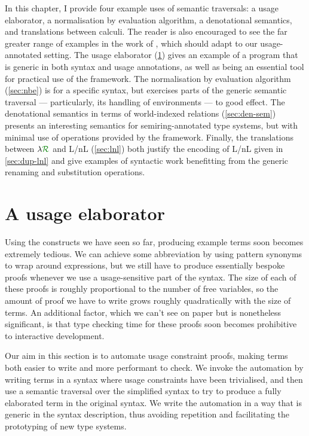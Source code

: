 In this chapter, I provide four example uses of semantic traversals:
a usage elaborator, a normalisation by evaluation algorithm, a denotational
semantics, and translations between calculi.
The reader is also encouraged to see the far greater range of examples in the
work of \citet{AACMM21}, which should adapt to our usage-annotated setting.
The usage elaborator (\cref{sec:usage-elaborator}) gives an example of a program
that is generic in both syntax and usage annotations, as well as being an
essential tool for practical use of the framework.
The normalisation by evaluation algorithm (\cref{sec:nbe}) is for a specific
syntax, but exercises parts of the generic semantic traversal --- particularly,
its handling of environments --- to good effect.
The denotational semantics in terms of world-indexed relations
(\cref{sec:den-sem}) presents an interesting semantics for semiring-annotated
type systems, but with minimal use of operations provided by the framework.
Finally, the translations between $\name$ and L/nL (\cref{sec:lnl}) both justify
the encoding of L/nL given in \cref{sec:dup-lnl} and give examples of syntactic
work benefitting from the generic renaming and substitution operations.


\section{A usage elaborator}\label{sec:usage-elaborator}

Using the constructs we have seen so far, producing example terms soon becomes
extremely tedious.
We can achieve some abbreviation by using pattern synonyms to wrap around
 expressions, but we still have to
produce essentially bespoke proofs whenever we use a usage-sensitive part of the
syntax.
The size of each of these proofs is roughly proportional to the number of free
variables, so the amount of proof we have to write grows roughly quadratically
with the size of terms.
An additional factor, which we can't see on paper but is nonetheless
significant, is that type checking time
for these proofs soon becomes prohibitive to interactive development.

Our aim in this section is to automate usage constraint proofs, making terms
both easier to write and more performant to check.
We invoke the automation by writing terms in a syntax where usage constraints
have been trivialised, and then use a semantic traversal over the simplified
syntax to try to produce a fully elaborated term in the original syntax.
We write the automation in a way that is generic in the syntax description, thus
avoiding repetition and facilitating the prototyping of new type systems.

